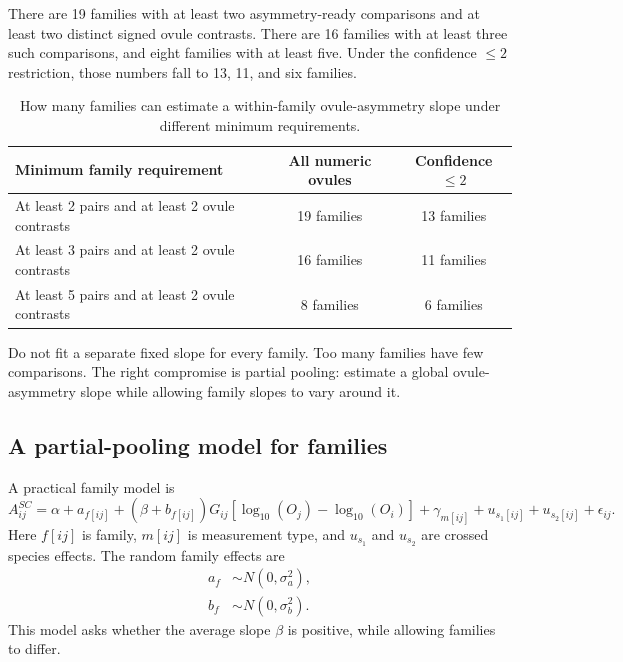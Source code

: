 \documentclass[12pt]{article}
\begin{document}
There are 19 families with at least two asymmetry-ready comparisons and at least two distinct signed ovule contrasts. There are 16 families with at least three such comparisons, and eight families with at least five. Under the confidence $\leq 2$ restriction, those numbers fall to 13, 11, and six families.

\begin{table}[H]
\centering
\small
\begin{tabular}{lcc}
\toprule
Minimum family requirement & All numeric ovules & Confidence $\leq 2$ \\
\midrule
At least 2 pairs and at least 2 ovule contrasts & 19 families & 13 families \\
At least 3 pairs and at least 2 ovule contrasts & 16 families & 11 families \\
At least 5 pairs and at least 2 ovule contrasts & 8 families & 6 families \\
\bottomrule
\end{tabular}
\caption{How many families can estimate a within-family ovule-asymmetry slope under different minimum requirements.}
\label{tab:family-slope-capacity}
\end{table}

\begin{conclusionbox}
Do not fit a separate fixed slope for every family. Too many families have few comparisons. The right compromise is partial pooling: estimate a global ovule-asymmetry slope while allowing family slopes to vary around it.
\end{conclusionbox}

\subsection{A partial-pooling model for families}

A practical family model is
\begin{equation}
A^{SC}_{ij}=\alpha+a_{f[ij]}+
\left(\beta+b_{f[ij]}\right)G_{ij}\left[\log_{10}(O_j)-\log_{10}(O_i)\right]
+\gamma_{m[ij]}+u_{s_1[ij]}+u_{s_2[ij]}+\epsilon_{ij}.
\label{eq:family-pooling}
\end{equation}
Here $f[ij]$ is family, $m[ij]$ is measurement type, and $u_{s_1}$ and $u_{s_2}$ are crossed species effects. The random family effects are
\begin{align}
a_f &\sim N(0,\sigma_a^2),\\
b_f &\sim N(0,\sigma_b^2).
\end{align}
This model asks whether the average slope $\beta$ is positive, while allowing families to differ.
\end{document}
